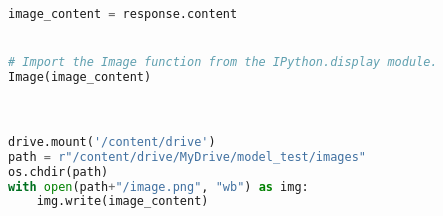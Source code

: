 \begin{lstlisting}[language=Python]
image_content = response.content


# Import the Image function from the IPython.display module. 
Image(image_content)



drive.mount('/content/drive')
path = r"/content/drive/MyDrive/model_test/images"
os.chdir(path)
with open(path+"/image.png", "wb") as img:
    img.write(image_content)




\end{lstlisting}